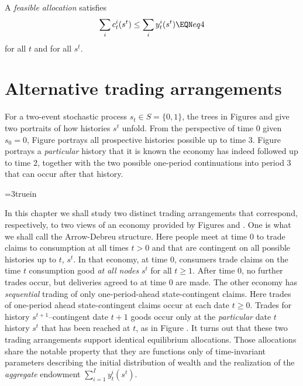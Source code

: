 
A {\it feasible allocation} satisfies
$$\sum_i c_t^i(s^t) \leq \sum_i y_t^i(s^t)  \EQN eq4 $$
for all $t$ and for all $s^t$.


\section{Alternative trading arrangements}
For a two-event stochastic process $s_t \in S = \{0, 1\}$, the
trees in Figures  and  %
 give
two portraits of how histories $s^t$ unfold.  From the
perspective of time $0$ given $s_0=0$, Figure  portrays
all prospective histories possible up to time
$3$. Figure  portrays  a {\it particular\/} history that it is
known the economy has indeed followed up to   time $2$, together
with the  two possible one-period continuations into period $3$
that can occur after that history.


\centerline{\epsfxsize=3truein} \caption{The
Arrow-Debreu commodity space for a two-state Markov chain. At time
$0$, there are trades in time $t=3$ goods for each of the eight
nodes that signify histories that can possibly be reached starting from
the node at time $0$.} 
\endfigure



In this chapter we shall study two distinct trading arrangements
that correspond, respectively,  to  two views of an economy provided by
Figures  and . %
One is
what we shall call the Arrow-Debreu structure.  Here  people meet
at time $0$ to  trade claims to consumption at all times $t >0$
and that are contingent on all possible histories up to $t$,
$s^t$. In that economy, at time $0$, consumers trade claims on
the time $t$ consumption good {\it at all nodes\/} $s^t$   for all $t \geq 1$. After
time $0$, no further trades occur, but deliveries agreed to at time $0$ are made.
     The other economy has {\it sequential\/} trading of
only one-period-ahead state-contingent claims. Here trades of one-period ahead state-contingent claims occur
at each date $t \geq 0$.   Trades for history
$s^{t+1}$--contingent date $t+1$ goods occur only at the {\it
particular\/}   date $t$ history $s^t$ that has been reached at
$t$, as in Figure .   %
 It turns out that  these two trading
arrangements support identical equilibrium allocations. 
Those
allocations share the notable property that they are  functions only of   time-invariant
parameters describing the initial distribution of wealth and  
the realization of
the {\it aggregate\/} endowment $\sum_{i=1}^I y_t^i(s^t)$.






